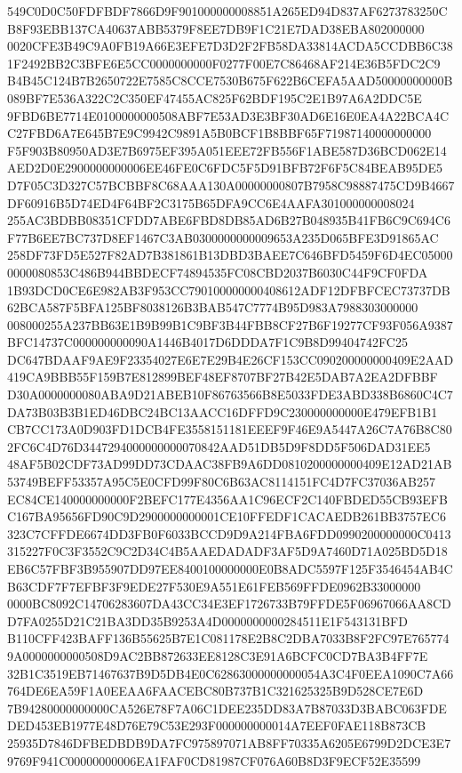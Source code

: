 \documentclass[UTF8,fontset=fandol,zihao=-4,a4paper]{ctexart}
\begin{document}
{{549C0D0C50FDFBDF7866D9F901000000008851A265ED94D837AF6273783250CB8F93EBB137CA40637ABB5379F8EE7DB9F1C21E7DAD38EBA802000000
0020CFE3B49C9A0FB19A66E3EFE7D3D2F2FB58DA33814ACDA5CCDBB6C381F2492BB2C3BFE6E5CC0000000000F0277F00E7C86468AF214E36B5FDC2C9
B4B45C124B7B2650722E7585C8CCE7530B675F622B6CEFA5AAD50000000000B089BF7E536A322C2C350EF47455AC825F62BDF195C2E1B97A6A2DDC5E
9FBD6BE7714E0100000000508ABF7E53AD3E3BF30AD6E16E0EA4A22BCA4CC27FBD6A7E645B7E9C9942C9891A5B0BCF1B8BBF65F71987140000000000
F5F903B80950AD3E7B6975EF395A051EEE72FB556F1ABE587D36BCD062E14AED2D0E2900000000006EE46FE0C6FDC5F5D91BFB72F6F5C84BEAB95DE5
D7F05C3D327C57BCBBF8C68AAA130A00000000807B7958C98887475CD9B4667DF60916B5D74ED4F64BF2C3175B65DFA9CC6E4AAFA301000000008024
255AC3BDBB08351CFDD7ABE6FBD8DB85AD6B27B048935B41FB6C9C694C6F77B6EE7BC737D8EF1467C3AB0300000000009653A235D065BFE3D91865AC
258DF73FD5E527F82AD7B381861B13DBD3BAEE7C646BFD5459F6D4EC050000000080853C486B944BBDECF74894535FC08CBD2037B6030C44F9CF0FDA
1B93DCD0CE6E982AB3F953CC790100000000408612ADF12DFBFCEC73737DB62BCA587F5BFA125BF8038126B3BAB547C7774B95D983A7988303000000
008000255A237BB63E1B9B99B1C9BF3B44FBB8CF27B6F19277CF93F056A9387BFC14737C000000000090A1446B4017D6DDDA7F1C9B8D99404742FC25
DC647BDAAF9AE9F23354027E6E7E29B4E26CF153CC090200000000409E2AAD419CA9BBB55F159B7E812899BEF48EF8707BF27B42E5DAB7A2EA2DFBBF
D30A0000000080ABA9D21ABEB10F86763566B8E5033FDE3ABD338B6860C4C7DA73B03B3B1ED46DBC24BC13AACC16DFFD9C230000000000E479EFB1B1
CB7CC173A0D903FD1DCB4FE3558151181EEEF9F46E9A5447A26C7A76B8C802FC6C4D76D3447294000000000070842AAD51DB5D9F8DD5F506DAD31EE5
48AF5B02CDF73AD99DD73CDAAC38FB9A6DD0810200000000409E12AD21AB53749BEFF53357A95C5E0CFD99F80C6B63AC8114151FC4D7FC37036AB257
EC84CE140000000000F2BEFC177E4356AA1C96ECF2C140FBDED55CB93EFBC167BA95656FD90C9D2900000000001CE10FFEDF1CACAEDB261BB3757EC6
323C7CFFDE6674DD3FB0F6033BCCD9D9A214FBA6FDD0990200000000C0413315227F0C3F3552C9C2D34C4B5AAEDADADF3AF5D9A7460D71A025BD5D18
EB6C57FBF3B955907DD97EE8400100000000E0B8ADC5597F125F3546454AB4CB63CDF7F7EFBF3F9EDE27F530E9A551E61FEB569FFDE0962B33000000
0000BC8092C14706283607DA43CC34E3EF1726733B79FFDE5F06967066AA8CDD7FA0255D21C21BA3DD35B9253A4D0000000000284511E1F543131BFD
B110CFF423BAFF136B55625B7E1C081178E2B8C2DBA7033B8F2FC97E7657749A0000000000508D9AC2BB872633EE8128C3E91A6BCFC0CD7BA3B4FF7E
32B1C3519EB71467637B9D5DB4E0C62863000000000054A3C4F0EEA1090C7A66764DE6EA59F1A0EEAA6FAACEBC80B737B1C321625325B9D528CE7E6D
7B94280000000000CA526E78F7A06C1DEE235DD83A7B87033D3BABC063FDEDED453EB1977E48D76E79C53E293F000000000014A7EEF0FAE118B873CB
25935D7846DFBEDBDB9DA7FC975897071AB8FF70335A6205E6799D2DCE3E79769F941C00000000006EA1FAF0CD81987CF076A60B8D3F9ECF52E35599
}}
\end{document}
